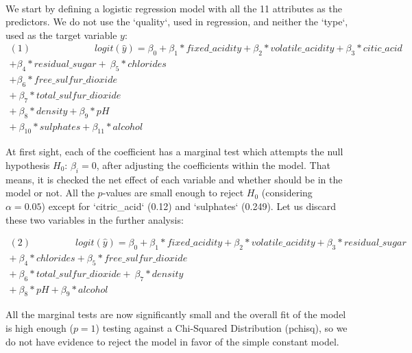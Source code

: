 \documentclass[10pt]{article}
\begin{document}
\paragraph*{}
We start by defining a logistic regression model with all the 11 attributes as the predictors. We do not use the `quality`, used in regression, and neither the `type`, used as the target variable $y$:
\begin{equation*}
\begin{aligned}	
(1) \ \ \ \  \ \ \ \ \ \ \ \ \ \ \ \ \ \ \ \ \ \ \ \ \ \ \ \ \ \ logit(\hat{y}) = \beta_0 + \beta_1*fixed\_acidity + \beta_2*volatile\_acidity 
 + \beta_3*citic\_acid  \\ +\beta_4*residual\_sugar 
+ \ \beta_5*chlorides\\ + \beta_6*free\_sulfur\_dioxide  \\+ \ \beta_7*total\_sulfur\_dioxide   
 \\ + \ \beta_8*density + \beta_9*pH  \\+ \ \beta_{10}*sulphates + \beta_{11}*alcohol 	
\end{aligned}
\end{equation*}

At first sight, each of the coefficient has a marginal test which attempts the null hypothesis $H_0$: $\beta_i = 0$, after adjusting the coefficients within the model. That means, it is checked the net effect of each variable and whether should be in the model or not. All the $p$-values are small enough to reject $H_0$ (considering $\alpha = 0.05$) except for `citric\_acid` (0.12) and `sulphates` (0.249). Let us discard these two variables in the further analysis:

\begin{equation*}
\begin{aligned}	
(2) \ \ \ \  \ \ \ \ \ \ \ \ \ \ \ \ \ \ \ \ \  logit(\hat{y}) = \beta_0 + \beta_1*fixed\_acidity + \beta_2*volatile\_acidity 
  +\beta_3*residual\_sugar \\
+ \ \beta_4*chlorides + \beta_5*free\_sulfur\_dioxide  \\+ \ \beta_6*total\_sulfur\_dioxide   
 + \ \beta_7*density \\ + \ \beta_8*pH  +  \beta_{9}*alcohol
\end{aligned}
\end{equation*}

All the marginal tests are now significantly small and the overall fit of the model is high enough ($p = 1$) testing against a Chi-Squared Distribution (pchisq), so we do not have evidence to reject the model in favor of the simple constant model.
\end{document}
